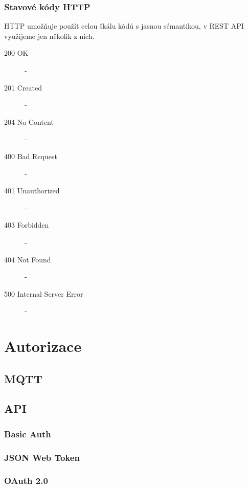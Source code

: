 \documentclass[czech,BP]{thesiskiv}
\begin{document}
			\subsubsection{Stavové kódy HTTP}
			HTTP umožňuje použít celou škálu kódů s jasnou sémantikou, v REST API využijeme jen několik z nich.
\begin{description}
\item [200 OK] - 
\item [201 Created] - 
\item [204 No Content] - 
\item [400 Bad Request] -
\item [401 Unauthorized] - 
\item [403 Forbidden] - 
\item [404 Not Found] - 
\item [500 Internal Server Error] - 
\end{description}


	\section{Autorizace}
		
		\subsection{MQTT}	
		
		
			
		\subsection{API}
			\subsubsection{Basic Auth}
			
			\subsubsection{JSON Web Token}
			\subsubsection{OAuth 2.0}
			
\end{document}
